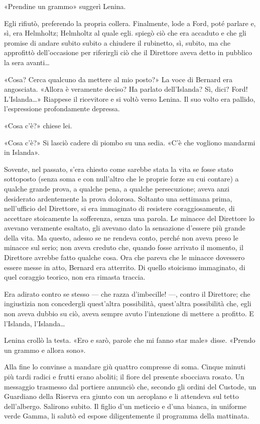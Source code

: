 \documentclass[
a5paper, %
10pt, %
twoside, 
onecolumn, %
openany, %
]{memoir}
\begin{document}
«Prendine un grammo» suggerì Lenina.

Egli rifiutò, preferendo la propria collera. Finalmente, lode a Ford, poté parlare e, sì, era Helmholtz; Helmholtz al quale egli. spiegò ciò che era accaduto e che gli promise di andare subito subito a chiudere il rubinetto, sì, subito, ma che approfittò dell’occasione per riferirgli ciò che il Direttore aveva detto in pubblico la sera avanti…

«Cosa? Cerca qualcuno da mettere al mio posto?» La voce di Bernard era angosciata. «Allora è veramente deciso? Ha parlato dell’Islanda? Sì, dici? Ford! L’Islanda…» Riappese il ricevitore e si voltò verso Lenina. Il suo volto era pallido, l’espressione profondamente depressa.

«Cosa c’è?» chiese lei.

«Cosa c’è?» Si lasciò cadere di piombo su una sedia. «C’è che vogliono mandarmi in Islanda».

Sovente, nel passato, s’era chiesto come sarebbe stata la vita se fosse stato sottoposto (senza soma e con null’altro che le proprie forze su cui contare) a qualche grande prova, a qualche pena, a qualche persecuzione; aveva anzi desiderato ardentemente la prova dolorosa. Soltanto una settimana prima, nell’ufficio del Direttore, si era immaginato di resistere coraggiosamente, di accettare stoicamente la sofferenza, senza una parola. Le minacce del Direttore lo avevano veramente esaltato, gli avevano dato la sensazione d’essere più grande della vita. Ma questo, adesso se ne rendeva conto, perché non aveva preso le minacce sul serio; non aveva creduto che, quando fosse arrivato il momento, il Direttore avrebbe fatto qualche cosa. Ora che pareva che le minacce dovessero essere messe in atto, Bernard era atterrito. Di quello stoicismo immaginato, di quel coraggio teorico, non era rimasta traccia.

Era adirato contro se stesso — che razza d’imbecille! —, contro il Direttore; che ingiustizia non concedergli quest’altra possibilità, quest’altra possibilità che, egli non aveva dubbio su ciò, aveva sempre avuto l’intenzione di mettere a profitto. E l’Islanda, l’Islanda…

Lenina crollò la testa. «Ero e sarò, parole che mi fanno star male» disse. «Prendo un grammo e allora sono».

Alla fine lo convinse a mandare giù quattro compresse di soma. Cinque minuti più tardi radici e frutti erano aboliti; il fiore del presente sbocciava rosato. Un messaggio trasmesso dal portiere annunciò che, secondo gli ordini del Custode, un Guardiano della Riserva era giunto con un aeroplano e li attendeva sul tetto dell’albergo. Salirono subito. Il figlio d’un meticcio e d’una bianca, in uniforme verde Gamma, li salutò ed espose diligentemente il programma della mattinata.
\end{document}
